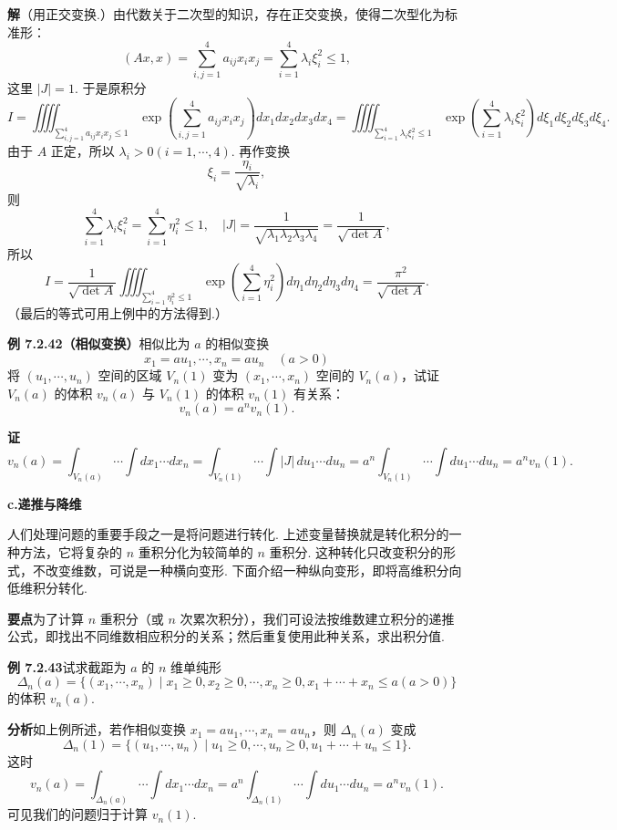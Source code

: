 \documentclass[UTF8,12pt,a4paper,fontset=fandol]{ctexart}
\begin{document}
\noindent\textbf{解}\quad （用正交变换.）由代数关于二次型的知识，存在正交变换，使得二次型化为标准形：
\[
(Ax,x)=\sum_{i,j=1}^4a_{ij}x_ix_j=\sum_{i=1}^4\lambda_i\xi_i^2\le1,
\]
这里 $|J|=1$. 于是原积分
\[
I=\iiiint_{\sum_{i,j=1}^4a_{ij}x_ix_j\le1}
\exp\left(\sum_{i,j=1}^4a_{ij}x_ix_j\right)dx_1dx_2dx_3dx_4
=\iiiint_{\sum_{i=1}^4\lambda_i\xi_i^2\le1}
\exp\left(\sum_{i=1}^4\lambda_i\xi_i^2\right)d\xi_1d\xi_2d\xi_3d\xi_4.
\]
由于 $A$ 正定，所以 $\lambda_i>0(i=1,\cdots,4)$. 再作变换
\[
\xi_i=\frac{\eta_i}{\sqrt{\lambda_i}},
\]
则
\[
\sum_{i=1}^4\lambda_i\xi_i^2=\sum_{i=1}^4\eta_i^2\le1,\quad
|J|=\frac1{\sqrt{\lambda_1\lambda_2\lambda_3\lambda_4}}
=\frac1{\sqrt{\det A}},
\]
所以
\[
I=\frac1{\sqrt{\det A}}\iiiint_{\sum_{i=1}^4\eta_i^2\le1}
\exp\left(\sum_{i=1}^4\eta_i^2\right)d\eta_1d\eta_2d\eta_3d\eta_4
=\frac{\pi^2}{\sqrt{\det A}}.
\]
（最后的等式可用上例中的方法得到.）

\noindent\textbf{例 7.2.42（相似变换）}\quad 相似比为 $a$ 的相似变换
\[
x_1=au_1,\cdots,x_n=au_n\quad(a>0)
\]
将 $(u_1,\cdots,u_n)$ 空间的区域 $V_n(1)$ 变为 $(x_1,\cdots,x_n)$ 空间的 $V_n(a)$，试证 $V_n(a)$ 的体积 $v_n(a)$ 与 $V_n(1)$ 的体积 $v_n(1)$ 有关系：
\[
v_n(a)=a^nv_n(1).
\]

\noindent\textbf{证}\quad
\[
v_n(a)=\int_{V_n(a)}\cdots\int dx_1\cdots dx_n
=\int_{V_n(1)}\cdots\int |J|\,du_1\cdots du_n
=a^n\int_{V_n(1)}\cdots\int du_1\cdots du_n
=a^nv_n(1).
\]

\noindent\textbf{c.\quad 递推与降维}

人们处理问题的重要手段之一是将问题进行转化. 上述变量替换就是转化积分的一种方法，它将复杂的 $n$ 重积分化为较简单的 $n$ 重积分. 这种转化只改变积分的形式，不改变维数，可说是一种横向变形. 下面介绍一种纵向变形，即将高维积分向低维积分转化.

\noindent\textbf{要点}\quad 为了计算 $n$ 重积分（或 $n$ 次累次积分），我们可设法按维数建立积分的递推公式，即找出不同维数相应积分的关系；然后重复使用此种关系，求出积分值.

\noindent\textbf{例 7.2.43}\quad 试求截距为 $a$ 的 $n$ 维单纯形
\[
\Delta_n(a)=\{(x_1,\cdots,x_n)\mid x_1\ge0,x_2\ge0,\cdots,x_n\ge0,
x_1+\cdots+x_n\le a(a>0)\} \tag{1}
\]
的体积 $v_n(a)$.

\noindent\textbf{分析}\quad 如上例所述，若作相似变换 $x_1=au_1,\cdots,x_n=au_n$，则 $\Delta_n(a)$ 变成
\[
\Delta_n(1)=\{(u_1,\cdots,u_n)\mid u_1\ge0,\cdots,u_n\ge0,u_1+\cdots+u_n\le1\}. \tag{2}
\]
这时
\[
v_n(a)=\int_{\Delta_n(a)}\cdots\int dx_1\cdots dx_n
=a^n\int_{\Delta_n(1)}\cdots\int du_1\cdots du_n
=a^nv_n(1). \tag{3}
\]
可见我们的问题归于计算 $v_n(1)$.
\end{document}
